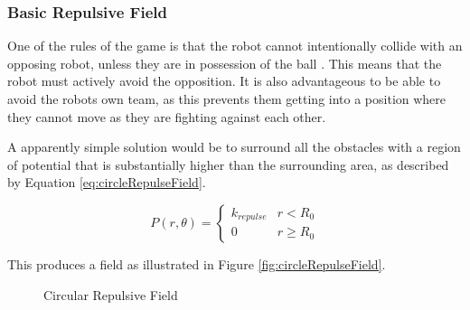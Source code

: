 \documentclass[10pt]{article}
\begin{document}
\subsubsection{Basic Repulsive Field\label{sub:Basic-Repulsive-Field}}

One of the rules of the game is that the robot cannot intentionally collide with
an opposing robot, unless they are in possession of the ball
\cite{simurosotSim}. This means that the robot must actively avoid the
opposition. It is also advantageous to be able to avoid the robots own team, as
this prevents them getting into a position where they cannot move as they are
fighting against each other.

A apparently simple solution would be to surround all the obstacles with a
region of potential that is substantially higher than the surrounding area, as
described by Equation \ref{eq:circleRepulseField}.

\begin{equation}
P\left(r,\theta\right)=\begin{cases}
k_{repulse} & r<R_{0}\\
0 & r\geq R_{0}
\end{cases}\label{eq:circleRepulseField}
\end{equation}

This produces a field as illustrated in Figure \ref{fig:circleRepulseField}.

\begin{figure}
 \centering
 \caption{Circular Repulsive Field}
\end{figure}
\end{document}
